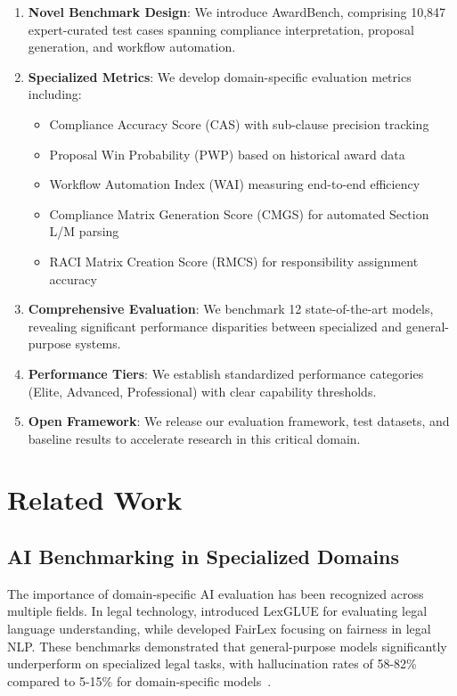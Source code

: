 \documentclass[11pt,a4paper]{article}
\begin{document}
\begin{enumerate}
    \item \textbf{Novel Benchmark Design}: We introduce AwardBench, comprising 10,847 expert-curated test cases spanning compliance interpretation, proposal generation, and workflow automation.
    
    \item \textbf{Specialized Metrics}: We develop domain-specific evaluation metrics including:
    \begin{itemize}
        \item Compliance Accuracy Score (CAS) with sub-clause precision tracking
        \item Proposal Win Probability (PWP) based on historical award data
        \item Workflow Automation Index (WAI) measuring end-to-end efficiency
        \item Compliance Matrix Generation Score (CMGS) for automated Section L/M parsing
        \item RACI Matrix Creation Score (RMCS) for responsibility assignment accuracy
    \end{itemize}
    
    \item \textbf{Comprehensive Evaluation}: We benchmark 12 state-of-the-art models, revealing significant performance disparities between specialized and general-purpose systems.
    
    \item \textbf{Performance Tiers}: We establish standardized performance categories (Elite, Advanced, Professional) with clear capability thresholds.
    
    \item \textbf{Open Framework}: We release our evaluation framework, test datasets, and baseline results to accelerate research in this critical domain.
\end{enumerate}

\section{Related Work}

\subsection{AI Benchmarking in Specialized Domains}

The importance of domain-specific AI evaluation has been recognized across multiple fields. In legal technology, \citet{katz2024lexglue} introduced LexGLUE for evaluating legal language understanding, while \citet{chalkidis2022fairlex} developed FairLex focusing on fairness in legal NLP. These benchmarks demonstrated that general-purpose models significantly underperform on specialized legal tasks, with hallucination rates of 58-82\% compared to 5-15\% for domain-specific models~\citep{thomson2024legal}.
\end{document}
